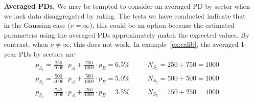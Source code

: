 \documentclass[11pt,fleqn]{book} %
\begin{document}

\textbf{Averaged PDs}. We may be tempted to consider an averaged PD by sector 
when we lack data disaggregated by rating. The tests we have conducted 
indicate that in the Gaussian case ($\nu = \infty$), this could be an option 
because the estimated parameters using the averaged PDs approximately match 
the expected values. By contrast, when $\nu \ne \infty$, this does not work. 
In example~\ref{ex:calib}, the averaged 1-year PDs by sectors are
\begin{displaymath}
	\begin{array}{lll}
		p_{S_1} = \frac{250}{1000} \cdot p_A + \frac{750}{1000} \cdot p_B = 6.5\% & \quad & N_{S_1} = 250 + 750 = 1000 \\
		p_{S_2} = \frac{500}{1000} \cdot p_A + \frac{500}{1000} \cdot p_B = 5.0\% & \quad & N_{S_2} = 500 + 500 = 1000 \\
		p_{S_3} = \frac{750}{1000} \cdot p_A + \frac{250}{1000} \cdot p_B = 3.5\% & \quad & N_{S_3} = 750 + 250 = 1000 \\
	\end{array}
\end{displaymath}
\end{document}
